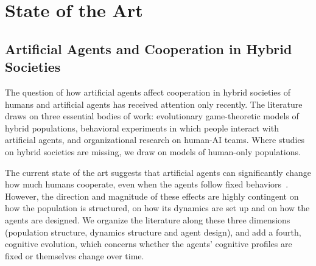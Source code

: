 %
%
%

\section{State of the Art}

\subsection{Artificial Agents and Cooperation in Hybrid Societies}

The question of how artificial agents affect cooperation in hybrid societies of humans and artificial agents has received attention only recently. The literature draws on three essential bodies of work: evolutionary game-theoretic models of hybrid populations, behavioral experiments in which people interact with artificial agents, and organizational research on human-AI teams. Where studies on hybrid societies are missing, we draw on models of human-only populations.

The current state of the art suggests that artificial agents can significantly change how much humans cooperate, even when the agents follow fixed behaviors~\cite{sharmaSmallBotsBig2023, guoFacilitatingCooperationHumanagent2023, terruchaArtCompensationHow2024, zimmaroEmergenceCooperationOneshot2024}. However, the direction and magnitude of these effects are highly contingent on how the population is structured, on how its dynamics are set up and on how the agents are designed. We organize the literature along these three dimensions (population structure, dynamics structure and agent design), and add a fourth, cognitive evolution, which concerns whether the agents' cognitive profiles are fixed or themselves change over time.

